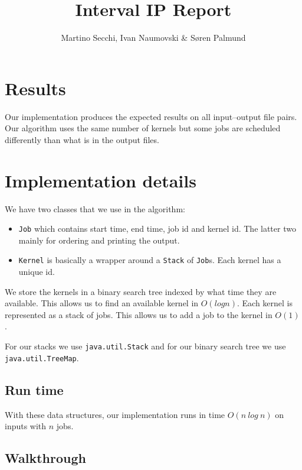 \documentclass{tufte-handout}
\title{Interval IP Report}
\author{Martino Secchi, Ivan Naumovski \& Søren Palmund}
\begin{document}
  \maketitle

  \section{Results}

  Our implementation produces the expected results on all
  input--output file pairs. Our algorithm uses the same number of kernels but some jobs are scheduled differently than what is in the output files. 

  \section{Implementation details}

  We have two classes that we use in the algorithm:
  \begin{itemize}
	\item \verb+Job+ which contains start time, end time, job id and kernel id. The latter two mainly for ordering and printing the output.
	\item \verb+Kernel+ is basically a wrapper around a \verb+Stack+ of \verb+Job+s. Each kernel has a unique id.
  \end{itemize}

  \noindent
  We store the kernels in a binary search tree indexed by what time they are available. This allows us to find an available kernel in $O(log n)$.\newline \noindent
  Each kernel is represented as a stack of jobs. This allows us to add a job to the kernel in $O(1)$.\linebreak
  
  \noindent
  For our stacks we use \verb+java.util.Stack+ and for our binary search tree we use \verb+java.util.TreeMap+.

\subsection{Run time}

  With these data structures, our implementation runs in time $O(n\ log\ n)$ on 
  inputs with $n$ jobs.

\subsection{Walkthrough}
\end{document}
